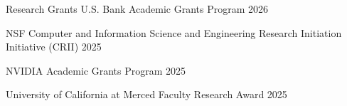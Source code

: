 \begin{rSection}{Research Grants}
U.S. Bank Academic Grants Program \hfill {2026}

NSF Computer and Information Science and Engineering Research Initiation Initiative (CRII) \hfill {2025}

NVIDIA Academic Grants Program \hfill {2025}

University of California at Merced Faculty Research Award \hfill {2025}

\end{rSection}

